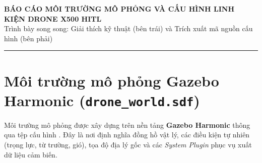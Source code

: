 \documentclass[11pt,a4paper]{article}
\begin{document}
\begin{center}
    {\LARGE\bfseries\color{PrimaryBlue} BÁO CÁO MÔI TRƯỜNG MÔ PHỎNG VÀ CẤU HÌNH LINH KIỆN DRONE X500 HITL}\\[0.4em]
    {\normalsize\color{MutedText} Trình bày song song: Giải thích kỹ thuật (bên trái) và Trích xuất mã nguồn cấu hình (bên phải)}
\end{center}
\vspace{0.5em}
\hrule
\vspace{1em}

\section{Môi trường mô phỏng Gazebo Harmonic (\texttt{drone\_world.sdf})}

Môi trường mô phỏng được xây dựng trên nền tảng \textbf{Gazebo Harmonic} thông qua tệp cấu hình . Đây là nơi định nghĩa đồng hồ vật lý, các điều kiện tự nhiên (trọng lực, từ trường, gió), tọa độ địa lý gốc và các \emph{System Plugin} phục vụ xuất dữ liệu cảm biến.

\end{document}

